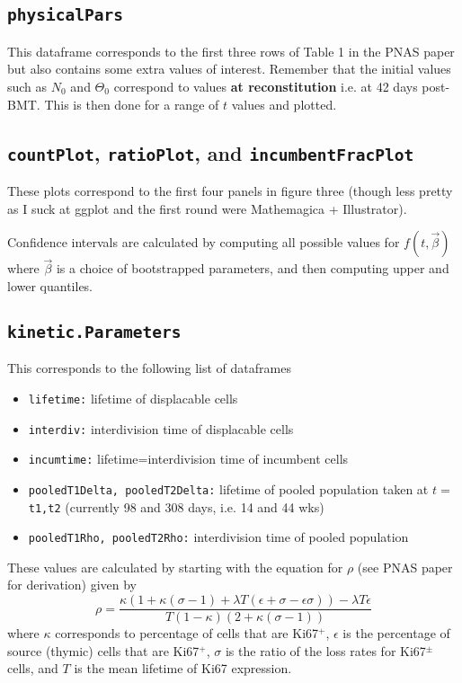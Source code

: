 \documentclass{tufte-book} %
\begin{document}
\subsection{\texttt{physicalPars}}

This dataframe corresponds to the first three rows of Table 1 in the PNAS paper but also contains some extra values of interest. Remember that the initial values such as $N_0$ and $\Theta_0$ correspond to values \textbf{at reconstitution} i.e. at 42 days post-BMT. This is then done for a range of $t$ values and plotted.
\subsection{\texttt{countPlot}, \texttt{ratioPlot}, and \texttt{incumbentFracPlot}}

These plots correspond to the first four panels in figure three (though less pretty as I suck at ggplot and the first round were Mathemagica + Illustrator).

Confidence intervals are calculated by computing all possible values for $f(t,\vec{\beta})$ where $\vec{\beta}$ is a choice of bootstrapped parameters, and then computing upper and lower quantiles.

\subsection{\texttt{kinetic.Parameters}}

This corresponds to the following list of dataframes\\
\begin{itemize}
\item \texttt{lifetime:} lifetime of displacable cells 
\item \texttt{interdiv:} interdivision time of displacable cells 
\item \texttt{incumtime:} lifetime=interdivision time of incumbent cells
\item \texttt{pooledT1Delta, pooledT2Delta:} lifetime of pooled population taken at $t=$\texttt{t1,t2} (currently 98 and 308 days, i.e. 14 and 44 wks)
\item \texttt{pooledT1Rho, pooledT2Rho:} interdivision time of pooled population
\end{itemize}

These values are calculated by starting with the equation for $\rho$ (see PNAS paper for derivation) given by
\begin{equation}
\rho = \frac{\kappa (1+\kappa(\sigma-1)+\lambda T(\epsilon+\sigma-\epsilon \sigma))-\lambda T \epsilon}{T(1-\kappa)(2+\kappa(\sigma-1))}
\end{equation}
where $\kappa$ corresponds to percentage of cells that are Ki67$^+$, $\epsilon$ is the percentage of source (thymic) cells that are Ki67$^+$, $\sigma$ is the ratio of the loss rates for Ki67$^{\pm}$ cells, and $T$ is the mean lifetime of Ki67 expression.
\end{document}
